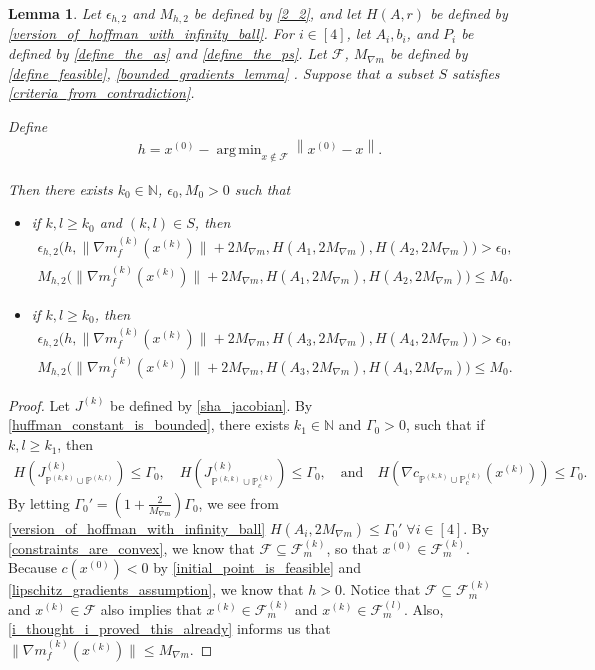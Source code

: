 \documentclass{article}
\newtheorem{lemma}[theorem]{Lemma}
\theoremstyle{case}
\numberwithin{theorem}{subsection}
\DeclareMathOperator*{\argmin}{arg\,min}
\newcommand{\feasiblek}{{\mathcal F_m^{(k)}}}
\newcommand{\feasiblel}{{\mathcal F_m^{(l)}}}
\newcommand{\feasible}{{\mathcal F}}
\newcommand{\gk}{{\nabla m_f^{(k)}\left(\xk\right)}}
\newcommand{\huff}{{\Gamma_0}}
\newcommand{\naturals}{\mathbb N}
\newcommand{\xk}{x^{(k)}}
\newcommand{\xinit}{{x^{(0)}}}
\newcommand{\trueactiveprojk}{{\mathbb P_c^{(k)}}}
\newcommand{\activeprojkk}{{\mathbb P^{(k, k)}}}
\newcommand{\activeprojkl}{{\mathbb P^{(k, l)}}}
\newcommand{\maxmodelgrad}{{M_{\nabla m}}}
\newcommand{\jackk}{{J^{(k)}}}
\newcommand{\jackkl}{{J^{(k)}_{\activeprojkk \cup \activeprojkl}}}
\newcommand{\jackt}{{J^{(k)}_{\activeprojkk \cup \trueactiveprojk}}}
\begin{document}
\begin{lemma}
\label{its_all_bounded}
Let $\epsilon_{h, 2}$ and $M_{h, 2}$ be defined by \cref{2_2},
and let $H(A, r)$ be defined by \cref{version_of_hoffman_with_infinity_ball}.
For $i \in [4]$, let $A_i, b_i$, and $P_i$ be defined by \cref{define_the_as} and \cref{define_the_ps}.
Let
$\feasible$, $\maxmodelgrad$
be defined by
\cref{define_feasible},
\cref{bounded_gradients_lemma}
.
Suppose that a subset $S$ satisfies \cref{criteria_from_contradiction}.

Define 
\begin{align*}
h = \xinit - \argmin_{x \not \in \feasible} \left\|\xinit - x\right\|.
\end{align*}

Then there exists $k_0 \in \naturals$, $\epsilon_0, M_0 > 0$ such that
\begin{itemize}
\item if $k, l \ge k_0$ and $(k, l) \in S$, then
\begin{align*}
\epsilon_{h, 2}\big(h, \|\gk\| + 2 \maxmodelgrad, H\left(A_1, 2 \maxmodelgrad\right), H\left(A_2, 2 \maxmodelgrad\right)\big) > \epsilon_0, \\
         M_{h, 2} \big(\|\gk\| + 2 \maxmodelgrad, H\left(A_1, 2 \maxmodelgrad\right), H\left(A_2, 2 \maxmodelgrad\right)\big) \le M_0.
\end{align*}
\item if $k, l \ge k_0$, then
\begin{align*}
\epsilon_{h, 2}\big(h, \|\gk\| + 2 \maxmodelgrad, H\left(A_3, 2 \maxmodelgrad\right), H\left(A_4, 2 \maxmodelgrad\right)\big) > \epsilon_0, \\
		 M_{h, 2} \big(\|\gk\| + 2 \maxmodelgrad, H\left(A_3, 2 \maxmodelgrad\right), H\left(A_4, 2 \maxmodelgrad\right)\big) \le M_0.
\end{align*}
\end{itemize}
\end{lemma}
\begin{proof}
Let $\jackk$ be defined by \cref{sha_jacobian}.
By \cref{huffman_constant_is_bounded}, there exists $k_1 \in \naturals$ and $\huff > 0$, such that if $k, l \ge k_1$, then 
\begin{align*}
H\left(\jackkl \right) \le \huff,
\quad 
H\left(\jackt\right) \le \huff,
\quad \textrm{and} \quad
H\left(\nabla c_{\activeprojkk \cup \trueactiveprojk }\left(\xk\right)\right) \le \huff.
\end{align*}
By letting $\huff' = \left(1 + \frac 2 {\maxmodelgrad} \right) \huff$, we see from \cref{version_of_hoffman_with_infinity_ball}
$H\left(A_i, 2 \maxmodelgrad\right) \le \huff' \; \forall i \in [4].$
By \cref{constraints_are_convex}, we know that $\feasible \subseteq \feasiblek$, so that $\xinit \in \feasiblek$.
Because $c\left(\xinit\right) < 0$ by \cref{initial_point_is_feasible} and \cref{lipschitz_gradients_assumption}, we know that $h > 0$.
Notice that $\feasible \subseteq \feasiblek$ and $\xk \in \feasible$ also implies that
$\xk \in \feasiblek$ and $\xk \in \feasiblel$.
Also, \cref{i_thought_i_proved_this_already} informs us that $\|\gk\| \le \maxmodelgrad$.

\end{proof}
\end{document}

